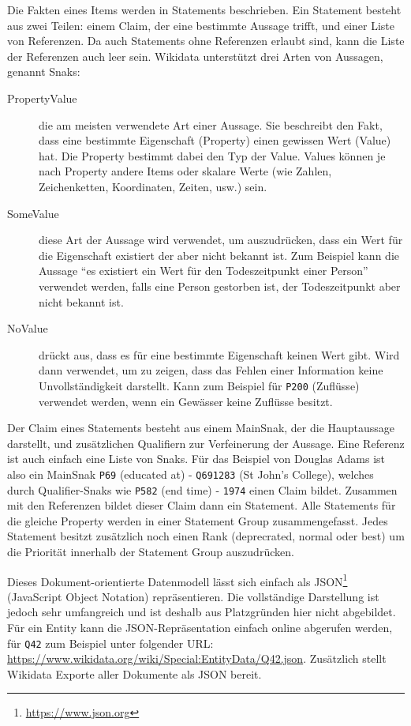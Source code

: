 Die Fakten eines Items werden in Statements beschrieben.
Ein Statement besteht aus zwei Teilen: einem Claim, der eine bestimmte Aussage trifft, und einer Liste von Referenzen.
Da auch Statements ohne Referenzen erlaubt sind, kann die Liste der Referenzen auch leer sein.
Wikidata unterstützt drei Arten von Aussagen, genannt Snaks:
\begin{description}
\item[PropertyValue] die am meisten verwendete Art einer Aussage. Sie beschreibt den Fakt, dass eine bestimmte Eigenschaft (Property) einen gewissen Wert (Value) hat. Die Property bestimmt dabei den Typ der Value. Values können je nach Property andere Items oder skalare Werte (wie Zahlen, Zeichenketten, Koordinaten, Zeiten, usw.) sein.
\item[SomeValue] diese Art der Aussage wird verwendet, um auszudrücken, dass ein Wert für die Eigenschaft existiert der aber nicht bekannt ist. Zum Beispiel kann die Aussage ``es existiert ein Wert für den Todeszeitpunkt einer Person'' verwendet werden, falls eine Person gestorben ist, der Todeszeitpunkt aber nicht bekannt ist.
\item[NoValue] drückt aus, dass es für eine bestimmte Eigenschaft keinen Wert gibt. Wird dann verwendet, um zu zeigen, dass das Fehlen einer Information keine Unvollständigkeit darstellt. Kann zum Beispiel für \verb|P200| (Zuflüsse) verwendet werden, wenn ein Gewässer keine Zuflüsse besitzt. 
\end{description}
Der Claim eines Statements besteht aus einem MainSnak, der die Hauptaussage darstellt, und zusätzlichen Qualifiern zur Verfeinerung der Aussage.
Eine Referenz ist auch einfach eine Liste von Snaks. 
Für das Beispiel von Douglas Adams ist also ein MainSnak \verb|P69| (educated at) - \verb|Q691283| (St John's College), welches durch Qualifier-Snaks wie \verb|P582| (end time) - \verb|1974| einen Claim bildet. 
Zusammen mit den Referenzen bildet dieser Claim dann ein Statement.
Alle Statements für die gleiche Property werden in einer Statement Group zusammengefasst.
Jedes Statement besitzt zusätzlich noch einen Rank (deprecrated, normal oder best) um die Priorität innerhalb der Statement Group auszudrücken.

Dieses Dokument-orientierte Datenmodell lässt sich einfach als JSON\footnote{\url{https://www.json.org}} (JavaScript Object Notation) repräsentieren.
Die vollständige Darstellung ist jedoch sehr umfangreich und ist deshalb aus Platzgründen hier nicht abgebildet.
Für ein Entity kann die JSON-Repräsentation einfach online abgerufen werden, für \verb|Q42| zum Beispiel unter folgender URL: \url{https://www.wikidata.org/wiki/Special:EntityData/Q42.json}.
Zusätzlich stellt Wikidata Exporte aller Dokumente als JSON bereit.

